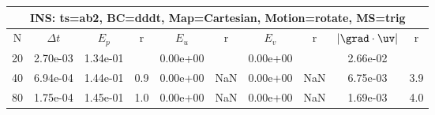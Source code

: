 
\begin{tabular}{|c|c|c|c|c|c|c|c|c|c|} \hline
 \multicolumn{10}{|c|}{INS: ts=ab2, BC=dddt, Map=Cartesian, Motion=rotate, MS=trig } \\ \hline 
     N  &   $\Delta t$ & $E_p$   &  r  &   $E_u$   &   r    &   $E_v$   & r   &  $|\grad\cdot\uv|$  & r   \\ \hline 
  20   &  2.70e-03  &   1.34e-01  &        &   0.00e+00  &        &   0.00e+00  &        &   2.66e-02  &        \\ 
  40   &  6.94e-04  &   1.44e-01  & 0.9  &   0.00e+00  & NaN  &   0.00e+00  & NaN  &   6.75e-03  & 3.9  \\ 
  80   &  1.75e-04  &   1.45e-01  & 1.0  &   0.00e+00  & NaN  &   0.00e+00  & NaN  &   1.69e-03  & 4.0  \\ 
 \hline 
\end{tabular}
